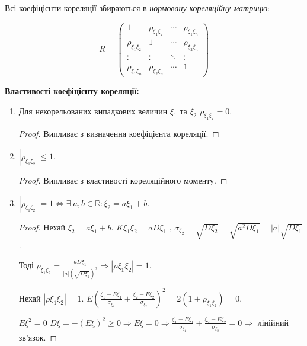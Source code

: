 \begin{definition}
    Всі коефіцієнти кореляції збираються в 
    \emph{нормовану кореляційну матрицю}:

    \begin{equation*}
        R = 
        \begin{pmatrix}
            1 & \rho_{\xi_1\xi_2} & \cdots & \rho_{\xi_1\xi_n} \\
            \rho_{\xi_1\xi_2} & 1 & \cdots & \rho_{\xi_2\xi_n} \\
            \vdots & \vdots & \ddots & \vdots \\
            \rho_{\xi_1\xi_n} & \rho_{\xi_2\xi_n} & \cdots & 1
        \end{pmatrix}
    \end{equation*}

\end{definition}

\noindent \textbf{Властивості коефіцієнту кореляції:}
\begin{enumerate}
    \item Для некорельованих випадкових величин $\xi_1$ та $\xi_2$ 
    $\rho_{\xi_1\xi_2} = 0$.
    \begin{proof}
        Випливає з визначення коефіцієнта кореляції.
    \end{proof}
    \item $\left|\rho_{\xi_1\xi_2}\right| \leq 1$.
    \begin{proof}
        Випливає з властивості кореляційного моменту.
    \end{proof}
    \item $\left|\rho_{\xi_1\xi_2}\right| = 1 \Leftrightarrow 
    \exists \; a, b \in \mathbb{R}: \xi_2 = a\xi_1 + b$.
    \begin{proof}
        Нехай 
        $\xi_2 = a\xi_1 + b$. $K\xi_1\xi_2 = 
        aD\xi_1$
        , 
        $\sigma_{\xi_2} = \sqrt{D\xi_2} = \sqrt{a^2D\xi_1} = 
        |a|\sqrt{D\xi_1}$.

        Тоді $\rho_{\xi_1\xi_2} = \frac{aD\xi_1}{|a|(\sqrt{D\xi_1})^2} 
        \Rightarrow
        \left|\rho\xi_1\xi_2\right| = 1$.

        Нехай $\left|\rho\xi_1\xi_2\right| = 1$.
        $E\left(\frac{\xi_1 - E\xi_1}{\sigma_{\xi_1}} 
        \pm \frac{\xi_2 - E\xi_2}{\sigma_{\xi_2}}\right)^2 = 
        2(1\pm\rho_{\xi_1\xi_2}) = 0$.

        $E\xi^2 = 0$ $D\xi = -(E\xi)^2 \geq 0 \Rightarrow E\xi = 0
        \Rightarrow \frac{\xi_1 - E\xi_1}{\sigma_{\xi_1}} 
        \pm \frac{\xi_2 - E\xi_2}{\sigma_{\xi_2}} = 0 \Rightarrow 
        $ лінійний зв'язок.
    \end{proof}
\end{enumerate}